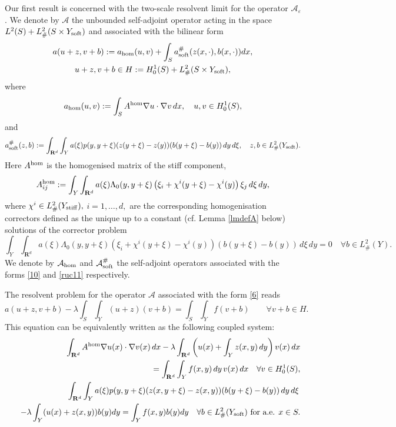 \documentclass[11pt]{article}
\newcommand\e {\varepsilon}
\newcommand\stiff{{\rm stiff}}
\newcommand\soft{{\rm soft}}
\newcommand{\R}{\mathbf{R}}
\def\AA{\mathcal{A}}
\def\l{\lambda}
\theoremstyle{remark}
\begin{document}
Our first result is concerned with the two-scale resolvent limit for the operator $\AA_\e$.
We denote by $\AA$ the unbounded self-adjoint operator acting in the space $L^2(S)+L^2_\#(S\times Y_\soft)$ and associated with the bilinear form
\begin{multline} \label{6}
	a(u+z,v+b): =  a_{\rm hom}(u,v) + \int_{S} a_\soft^\#(z(x,\cdot),b(x,\cdot))dx,
	\\
	u+z, v+b\in H:=H^1_0(S)+L^2_\#(S\times Y_\soft),
\end{multline} 	
where
\begin{equation}\label{10}
	a_{\rm hom}(u,v):=\int_S  A^{\rm hom} \nabla u \cdot \nabla v \, dx, \quad u,v \in H^1_0(S),
\end{equation}
and
\begin{equation} \label{ruc11}
	a_\soft^\#(z,b):= \int_{\mathbf{R}^d}\int_{Y}  a(\xi)p(y, y+\xi)(z(y+\xi)-z(y))(b(y+\xi)-b(y)) \,dy\,d\xi, \quad z,b \in L^2_\#(Y_\soft).
\end{equation} 	
Here $A^{\rm hom}$ is the homogenised matrix of the stiff component,
\begin{equation} \label{defA}
	A^{\rm hom}_{ij}:=\int_{Y} \int_{\R^d} a(\xi) \Lambda_0 (y,y+\xi)\left(\xi_i+\chi^i(y+\xi)-\chi^i(y) \right)\xi_j\,d\xi\,dy,
\end{equation}
where $\chi^i \in L^2_\#(Y_\stiff),$ $i=1,\dots,d,$ are the corresponding homogenisation correctors   defined as the unique up to a constant (cf. Lemma \ref{lmdefA} below) solutions of the corrector problem
\begin{equation} \label{ex102}
	\int_{Y} \int_{\R^d} a(\xi) \Lambda_0 (y,y+\xi)\left(\xi_i+\chi^i(y+\xi)-\chi^i(y) \right)\left(b(y+\xi)-b(y) \right) \,d\xi\, dy=0\quad \forall b \in L^2_\#(Y).
\end{equation}
We denote by  $\AA_{\rm hom}$
and  $\AA_\soft^\# $ the self-adjoint operators associated with the forms \eqref{10} and \eqref{ruc11} respectively.

The resolvent problem for the operator $\AA$ associated with the form \eqref{6} reads
\begin{equation}\label{limit_pr}
	a(u+z,v+b) - \l \int_{S} \int_{Y} (u+z)(v+b) = \int_{S} \int_{Y} f (v+b) \qquad \forall v+b\in H.
\end{equation}
This equation can be equivalently written as the following coupled system:
\begin{eqnarray} \nonumber
	& &\int_{\R^d}  A^{\rm hom} \nabla u(x) \cdot \nabla v(x) \, dx -\lambda\int_{\R^d} \left(u(x)+\int_{Y} z(x,y)\, dy\right)v(x)\, dx\\ & & \label{ruc1} \hspace{+40ex}=\int_{\R^d} \int_{Y} f(x,y)\,dy\,  v(x) \, dx \quad \forall v \in H^1_0(S), \\ \nonumber
	& & \int_{\R^d}\int_{Y}  a(\xi)p(y, y+\xi)(z(x,y+\xi)-z(x,y))(b(y+\xi)-b(y)) \,dy\,d\xi\, \\  & &  - \lambda  \int_{Y} (u(x)+z(x,y)) b(y)dy= \int_{Y} f(x,y) b(y)dy \quad \forall b\in L^2_\#(Y_\soft)  \textrm{ for a.e. } x \in S. 	\label{ex200}
\end{eqnarray}
\end{document}
